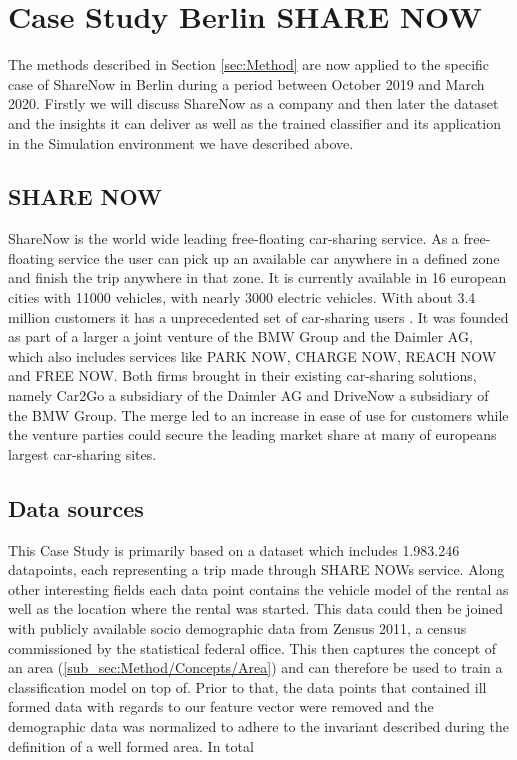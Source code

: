 \clearpage
\section{Case Study Berlin SHARE NOW}
\label{sec:CaseStudy}

The methods described in Section \ref{sec:Method} are now applied to the specific case
of ShareNow in Berlin during a period between October 2019 and March 2020. Firstly
we will discuss ShareNow as a company and then later the dataset and the insights it
can deliver as well as the trained classifier and its application in the Simulation
environment we have described above. 

\subsection{SHARE NOW}

ShareNow is the world wide leading free-floating car-sharing service.
As a free-floating service the user can pick up an available car anywhere in a defined zone
and finish the trip anywhere in that zone. It is currently available in 16 european cities
with 11000 vehicles, with nearly 3000 electric vehicles. With about 3.4 million customers
it has a unprecedented set of car-sharing users \cite{ShareNowAboutUs}. It was founded as 
part of a larger a joint venture of the BMW Group and the Daimler AG, which also includes
services like PARK NOW, CHARGE NOW, REACH NOW and FREE NOW. Both firms brought in their
existing car-sharing solutions, namely Car2Go a subsidiary of the Daimler AG and DriveNow
a subsidiary of the BMW Group. The merge led to an increase in ease of use for customers
while the venture parties could secure the leading market share at many of europeans
largest car-sharing sites.


\subsection{Data sources}
\label{sub_sec:CaseStudy/Data}

This Case Study is primarily based on a dataset which includes 1.983.246 datapoints, each 
representing a trip made through SHARE NOWs service. Along other interesting fields each data point
contains the vehicle model of the rental as well as the location where the rental was started.
This data could then be joined with publicly available socio demographic data from Zensus 2011, a census
commissioned by the statistical federal office. This then captures the concept of an area (\ref{sub_sec:Method/Concepts/Area})
and can therefore be used to train a classification model on top of. Prior to that, the data points
that contained ill formed data with regards to our feature vector were removed and the 
demographic data was normalized to adhere to the invariant described during the definition of a
well formed area. In total 


